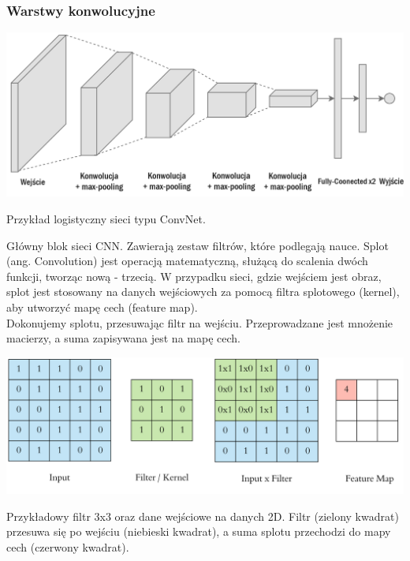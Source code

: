 \documentclass[12pt,a4paper]{article}
\begin{document}
    \subsubsection{Warstwy konwolucyjne}
        \begin{center}
            \includegraphics[scale=0.2]{dudi.png}
            \begin{flushright}
                \begin{scriptsize}
                Przykład logistyczny sieci typu ConvNet.
                \end{scriptsize}
            \end{flushright}
        \end{center}
        
        Główny blok sieci CNN. Zawierają zestaw filtrów, które podlegają nauce. Splot (ang. Convolution) jest operacją matematyczną, służącą do scalenia dwóch funkcji, tworząc nową - trzecią. W przypadku sieci, gdzie wejściem jest obraz, splot jest stosowany na danych wejściowych za pomocą filtra splotowego (kernel), aby utworzyć mapę cech  (feature map).
        \\
        
        Dokonujemy splotu, przesuwając filtr na wejściu. Przeprowadzane jest mnożenie macierzy, a suma zapisywana jest na mapę cech.
        \begin{center}
            \includegraphics[scale=0.35]{kernel.png}
            \begin{flushright}
                \begin{scriptsize}
                Przykładowy filtr 3x3 oraz dane wejściowe na danych 2D. Filtr (zielony kwadrat) przesuwa się po wejściu (niebieski kwadrat), a suma splotu przechodzi do mapy cech (czerwony kwadrat).
                \end{scriptsize}
            \end{flushright}
        \end{center}
        
\end{document}
